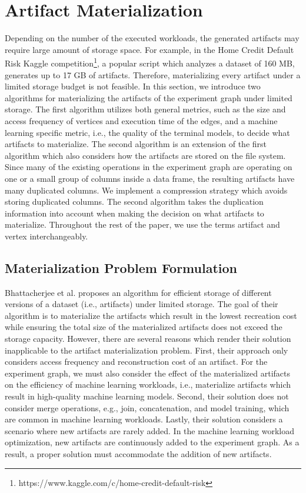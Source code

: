\section{Artifact Materialization}\label{sec-materialization}
Depending on the number of the executed workloads, the generated artifacts may require large amount of storage space.
For example, in the Home Credit Default Risk Kaggle competition\footnote{https://www.kaggle.com/c/home-credit-default-risk}, a popular script which analyzes a dataset of 160 MB, generates up to 17 GB of artifacts.
Therefore, materializing every artifact under a limited storage budget is not feasible.
In this section, we introduce two algorithms for materializing the artifacts of the experiment graph under limited storage.
The first algorithm utilizes both general metrics, such as the size and access frequency of vertices and execution time of the edges, and a machine learning specific metric, i.e., the quality of the terminal models, to decide what artifacts to materialize.
The second algorithm is an extension of the first algorithm which also considers how the artifacts are stored on the file system.
Since many of the existing operations in the experiment graph are operating on one or a small group of columns inside a data frame, the resulting artifacts have many duplicated columns.
We implement a compression strategy which avoids storing duplicated columns.
The second algorithm takes the duplication information into account when making the decision on what artifacts to materialize.
Throughout the rest of the paper, we use the terms artifact and vertex interchangeably.

\subsection{Materialization Problem Formulation}\label{subsec-materialization-problem}
Bhattacherjee et al. \cite{bhattacherjee2015principles} proposes an algorithm for efficient storage of different versions of a dataset (i.e., artifacts) under limited storage.
The goal of their algorithm is to materialize the artifacts which result in the lowest recreation cost while ensuring the total size of the materialized artifacts does not exceed the storage capacity.
However, there are several reasons which render their solution inapplicable to the artifact materialization problem.
First, their approach only considers access frequency and reconstruction cost of an artifact.
For the experiment graph, we must also consider the effect of the materialized artifacts on the efficiency of machine learning workloads, i.e., materialize artifacts which result in high-quality machine learning models.
Second, their solution does not consider merge operations, e.g., join, concatenation, and model training, which are common in machine learning workloads.
Lastly, their solution considers a scenario where new artifacts are rarely added.
In the machine learning workload optimization, new artifacts are continuously added to the experiment graph.
As a result, a proper solution must accommodate the addition of new artifacts.

